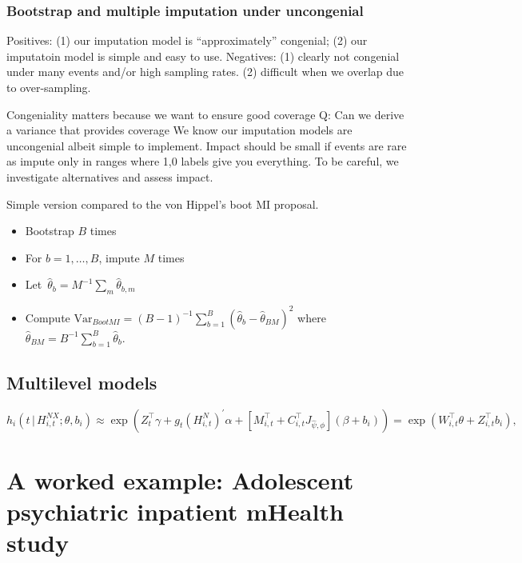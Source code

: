 \documentclass[11pt]{amsart}
\def\given{\, | \,}
\begin{document}
\subsubsection{Bootstrap and multiple imputation under uncongenial }

Positives: (1) our imputation model is ``approximately'' congenial; (2) our imputatoin model is simple and easy to use.
Negatives: (1) clearly not congenial under many events and/or high sampling rates. (2) difficult when we overlap due to over-sampling.

Congeniality matters because we want to ensure good coverage
Q: Can we derive a variance that provides coverage
We know our imputation models are uncongenial albeit simple to implement.  Impact should be small if events are rare as impute only in ranges where 1,0 labels give you everything.  To be careful, we investigate alternatives and assess impact.

Simple version compared to the von Hippel's boot MI proposal.
\begin{itemize}
\item Bootstrap $B$ times
\item For $b = 1, \ldots, B$, impute $M$ times
\item Let~$\hat \theta_b = M^{-1} \sum_m \hat \theta_{b,m}$
\item Compute $\text{Var}_{BootMI} = (B-1)^{-1} \sum_{b=1}^B (\hat \theta_b - \hat \theta_{BM})^2$ where $\hat \theta_{BM} = B^{-1} \sum_{b=1}^B \hat \theta_b$.
\end{itemize}


\subsection{Multilevel models}

\begin{equation}
\label{eq:multilevel}
h_i \left( t \given  H_{i,t}^{NX} ; \theta, b_i \right) \approx
\exp \left( Z_{t}^\top \gamma + g_t \left( H_{i,t}^{N} \right)^{\prime} \alpha
  + \left[ M_{i,t}^\top + C_{i,t}^\top J_{\hat \psi, \phi}\right] (\beta + b_i) \right)
= \exp \left( W_{i,t}^\top \theta  + Z_{i,t}^\top b_i \right),
\end{equation}

\section{A worked example: Adolescent psychiatric inpatient mHealth study} \label{section:example}
\end{document}
